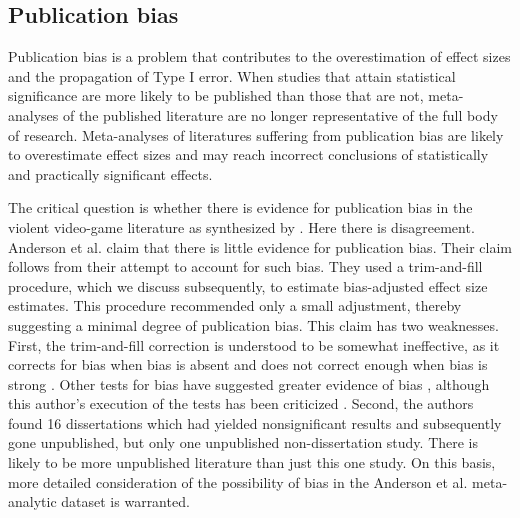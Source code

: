 \documentclass[man, mask]{apa6}
\begin{document}
\subsection{Publication bias}
Publication bias is a problem that contributes to the overestimation of effect sizes and the propagation of Type I error. When studies that attain statistical significance are more likely to be published than those that are not, meta-analyses of the published literature are no longer representative of the full body of research. Meta-analyses of literatures suffering from publication bias are likely to overestimate effect sizes and may reach incorrect conclusions of statistically and practically significant effects.

The critical question is whether there is evidence for publication bias in the violent video-game literature as synthesized by \citet{Anderson:etal:2010}.  Here there is disagreement.  Anderson et al. claim that there is little evidence for publication bias.  Their claim follows from their attempt to account for such bias.  They used a  trim-and-fill procedure, which we discuss subsequently, to estimate bias-adjusted effect size estimates. This procedure recommended only a small adjustment, thereby suggesting a minimal degree of publication bias. This claim has two weaknesses.  First, the trim-and-fill correction is understood to be somewhat ineffective, as it corrects for bias when bias is absent and does not correct enough when bias is strong \citep{Simonsohn:etal:2014b}. Other tests for bias have suggested greater evidence of bias \citep{Ferguson:2007}, although this author's execution of the tests has been criticized \citep[see][]{Anderson:etal:2010}. Second, the authors found 16 dissertations which had yielded nonsignificant results and subsequently gone unpublished, but only one unpublished non-dissertation study. There is likely to be more unpublished literature than just this one study. On this basis, more detailed consideration of the possibility of bias in the Anderson et al. meta-analytic dataset is warranted.
\end{document}
